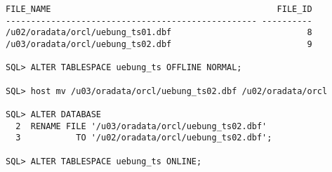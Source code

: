 \begin{enumerate}
\begin{lstlisting}[language=oracle_sql,alsolanguage=sqlplus]
FILE_NAME                                             FILE_ID
-------------------------------------------------- ----------
/u02/oradata/orcl/uebung_ts01.dbf                           8
/u03/oradata/orcl/uebung_ts02.dbf                           9

SQL> ALTER TABLESPACE uebung_ts OFFLINE NORMAL;

SQL> host mv /u03/oradata/orcl/uebung_ts02.dbf /u02/oradata/orcl

SQL> ALTER DATABASE
  2  RENAME FILE '/u03/oradata/orcl/uebung_ts02.dbf'
  3           TO '/u02/oradata/orcl/uebung_ts02.dbf';

SQL> ALTER TABLESPACE uebung_ts ONLINE;
      \end{lstlisting}
    
    \end{enumerate}
